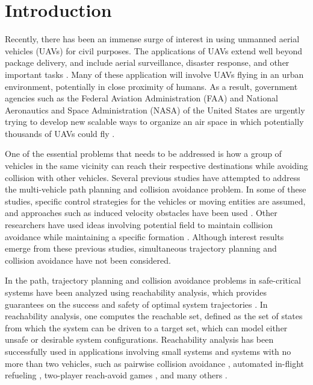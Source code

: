 \section{Introduction}
Recently, there has been an immense surge of interest in using unmanned aerial vehicles (UAVs) for civil purposes. The applications of UAVs extend well beyond package delivery, and include aerial surveillance, disaster response, and other important tasks \cite{Tice91, Debusk10, Amazon16, AUVSI16, BBC16}. Many of these application will involve UAVs flying in an urban environment, potentially in close proximity of humans. As a result, government agencies such as the Federal Aviation Administration (FAA) and National Aeronautics and Space Administration (NASA) of the United States are urgently trying to develop new scalable ways to organize an air space in which potentially thousands of UAVs could fly \cite{FAA13, NASA16}.

One of the essential problems that needs to be addressed is how a group of vehicles in the same vicinity can reach their respective destinations while avoiding collision with other vehicles. Several previous studies have attempted to address the multi-vehicle path planning and collision avoidance problem. In some of these studies, specific control strategies for the vehicles or moving entities are assumed, and approaches such as induced velocity obstacles have been used \cite{Fiorini98, Chasparis05, Vandenberg08}. Other researchers have used ideas involving potential field to maintain collision avoidance while maintaining a specific formation \cite{Saber02, Chuang07}. Although interest results emerge from these previous studies, simultaneous trajectory planning and collision avoidance have not been considered.

In the path, trajectory planning and collision avoidance problems in safe-critical systems have been analyzed using reachability analysis, which provides guarantees on the success and safety of optimal system trajectories \cite{Barron90, Mitchell05, Bokanowski10, Fisac15}. In reachability analysis, one computes the reachable set, defined as the set of states from which the system can be driven to a target set, which can model either unsafe or desirable system configurations. Reachability analysis has been successfully used in applications involving small systems and systems with no more than two vehicles, such as pairwise collision avoidance \cite{Mitchell05}, automated in-flight refueling \cite{Ding08}, two-player reach-avoid games \cite{Huang11}, and many others \cite{Bayen07, Chen15b, Chen15}.

